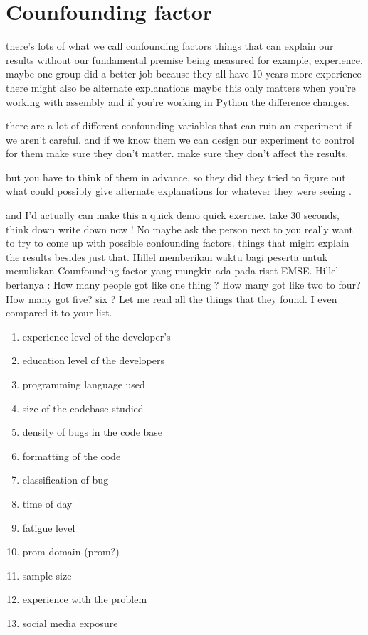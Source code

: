 \documentclass[14pt]{extreport}
\begin{document}
\section{Counfounding factor}
there's lots of what we call
confounding factors things that can
explain our results without our
fundamental premise being measured for
example, experience.
 maybe one group did a better job because they all have 10
years more experience there might also
be alternate explanations
maybe this only matters when you're
working with assembly and if you're
working in Python the difference changes.
\par
there are a lot of different confounding
variables that can ruin an experiment if
we aren't careful. 
and if we know them we
can design our experiment to control for
them make sure they don't matter.
make sure they don't affect the results.
\par
but you have to think of them in advance.
so they did they tried to figure out
what could possibly give alternate
explanations for whatever they were
seeing .
\par
and I'd actually can make this a
quick demo quick exercise.
take 30 seconds, think down write down now !
No maybe ask the person next to you really
want to try to come up with possible
confounding factors. things that might
explain the results besides just that.
Hillel memberikan waktu bagi peserta untuk menuliskan Counfounding factor yang mungkin ada pada riset EMSE.
Hillel bertanya :  How many people got like one thing ? How many got like two to four? 
How many got five? six ?
Let me read all the things that they found.
I even compared it to your list.
\begin{enumerate}
\item experience level of the developer's
\item education level of the developers
\item programming language used 
\item size of the codebase studied
\item density of bugs in the code base 
\item formatting of the code
\item classification of bug 
\item time of day
\item fatigue level 
\item prom domain (prom?)
\item sample size
\item experience with the problem 
\item social media exposure
\end{enumerate}
\end{document}
